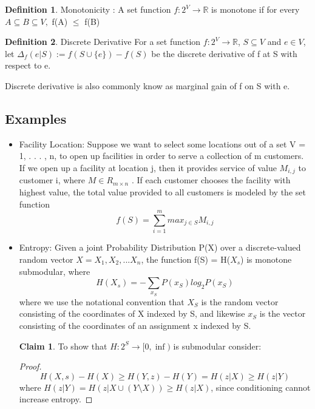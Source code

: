 \documentclass[a4paper,twoside]{iiththesis}
\theoremstyle{definition}
\newtheorem{definition}{Definition}[section]
\theoremstyle{definition}
\newtheorem{claim}{Claim}[section]
\theoremstyle{remark}
\begin{document}
\theoremstyle{definition}
\begin{definition}{Monotonicity :}
A set function $f:2^V\rightarrow \mathbb{R}$ is monotone if for every $A \subseteq B \subseteq V,$ f(A) $\leq$ f(B)
\end{definition}
\newpage
\theoremstyle{definition}
\begin{definition}{Discrete Derivative}
For a set function $f:2^V\rightarrow \mathbb{R}$, $S \subseteq V$ and $e\in V$, let $\Delta_{f}(e|S):= f(S \cup \{e\}) - f(S)$ be the discrete derivative of f at S with respect to e.
\end{definition}
Discrete derivative is also commonly know as marginal gain of f on S with e.

\subsection{Examples}

\begin{itemize}
\item Facility Location: Suppose we want to select some locations out of a set V = {1, . . . , n}, to open up facilities in order to serve a collection of m customers. If we open up a facility at location j, then it provides service of value $M_{i,j}$ to customer i, where $ M \in R_{m\times n}$ . If each customer chooses the facility with highest value, the total value provided to all customers is modeled by the set function
\begin{equation}
f(S) = \sum_{i=1}^m max_{j\in S} M_{i, j}
\end{equation}
\item Entropy: Given a joint Probability Distribution P(X) over a discrete-valued random vector $X = {X_1, X_2, ... X_n}$, the function f(S) = H($X_s$) is monotone submodular, where 
\begin{equation}
				H(X_s) = - \sum_{x_S} P(x_S) log_2 P(x_S)
\end{equation}
where we use the notational convention that $X_S$ is the random vector consisting of the coordinates of X indexed by S, and likewise $x_S$ is the vector consisting of the coordinates of an assignment x indexed by S. \\
\begin{claim}
To show that $H: 2^S \rightarrow [0, \inf)$ is submodular consider:
\end{claim}
\begin{proof}
\begin{equation}
H(X, s) - H(X) \geq H(Y, z)  -H(Y) = H(z|X) \geq H(z|Y)
\end{equation}
where $H(z|Y ) = H (z|X \cup (Y \setminus X)) \geq H(z|X)$, since conditioning cannot increase entropy.
\end{proof}
\end{itemize}
\end{document}
